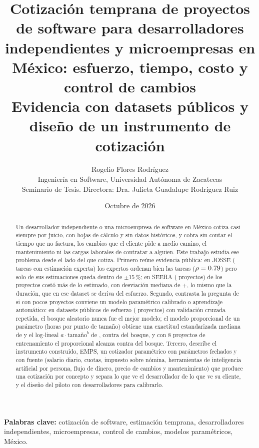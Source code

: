 \documentclass[10pt,twocolumn]{article}
\title{\Large\bfseries Cotización temprana de proyectos de software para desarrolladores independientes y microempresas en México: esfuerzo, tiempo, costo y control de cambios\\[4pt]
\large Evidencia con datasets públicos y diseño de un instrumento de cotización}
\author{Rogelio Flores Rodríguez\\
\small Ingeniería en Software, Universidad Autónoma de Zacatecas\\
\small Seminario de Tesis. Directora: Dra. Julieta Guadalupe Rodríguez Ruiz}
\date{\small Octubre de 2026}
\begin{document}
\maketitle

\begin{abstract}
\noindent Un desarrollador independiente o una microempresa de software en México cotiza casi siempre por juicio, con hojas de cálculo y sin datos históricos, y cobra sin contar el tiempo que no factura, los cambios que el cliente pide a medio camino, el mantenimiento ni las cargas laborales de contratar a alguien. Este trabajo estudia ese problema desde el lado del que cotiza. Primero reúne evidencia pública: en JOSSE (\nJosseExp{} tareas con estimación experta) los expertos ordenan bien las tareas ($\rho=0.79$) pero solo \predQuinceJosse{} de sus estimaciones queda dentro de $\pm$15\,\%; en SEERA (\nSeera{} proyectos) \subestSeera{} de los proyectos costó más de lo estimado, con desviación mediana de +\desvSeera{}, lo mismo que la duración, que en ese dataset se deriva del esfuerzo. Segundo, contrasta la pregunta de si con pocos proyectos conviene un modelo paramétrico calibrado o aprendizaje automático: en \nuevoNconjuntos{} datasets públicos de esfuerzo (\nuevoNproyectosPublicos{} proyectos) con validación cruzada repetida, el bosque aleatorio nunca fue el mejor modelo; el modelo proporcional de un parámetro (horas por punto de tamaño) obtiene una exactitud estandarizada mediana de \nuevoSAmedPropor{} y el log-lineal $a \cdot \text{tamaño}^{b}$ de \nuevoSAmedLoglin{}, contra \nuevoSAmedRF{} del bosque, y con 8 proyectos de entrenamiento el proporcional alcanza \nuevoCurvaOchoPropor{} contra \nuevoCurvaOchoRF{} del bosque. Tercero, describe el instrumento construido, EMPS, un cotizador paramétrico con parámetros fechados y con fuente (salario diario, cuotas, impuesto sobre nómina, herramientas de inteligencia artificial por persona, flujo de dinero, precio de cambios y mantenimiento) que produce una cotización por concepto y separa lo que ve el desarrollador de lo que ve su cliente, y el diseño del piloto con desarrolladores para calibrarlo.
\end{abstract}

\vspace{4pt}
\noindent\textbf{Palabras clave:} cotización de software, estimación temprana, desarrolladores independientes, microempresas, control de cambios, modelos paramétricos, México.
\end{document}
